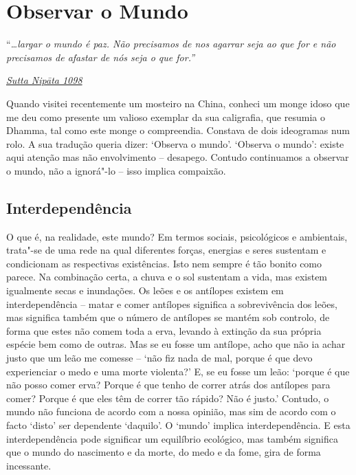 \chapter{Observar o Mundo}

``\emph{\ldots{}largar o mundo é paz. Não precisamos de nos agarrar seja ao que for e não precisamos de afastar de nós seja o que for.''}

\href{https://suttacentral.net/snp5.12/en/sujato}{\emph{Sutta Nipāta 1098}}

Quando visitei recentemente um mosteiro na China, conheci um monge idoso que me deu como presente um valioso exemplar da sua caligrafia, que resumia o Dhamma, tal como este monge o compreendia. Constava de dois ideogramas num rolo. A sua tradução queria dizer: `Observa o mundo'. `Observa o mundo': existe aqui atenção mas não envolvimento -- desapego. Contudo continuamos a observar o mundo, não a ignorá"-lo -- isso implica compaixão.

\section{Interdependência}

O que é, na realidade, este mundo? Em termos sociais, psicológicos e ambientais, trata"-se de uma rede na qual diferentes forças, energias e seres sustentam e condicionam as respectivas existências. Isto nem sempre é tão bonito como parece. Na combinação certa, a chuva e o sol sustentam a vida, mas existem igualmente secas e inundações. Os leões e os antílopes existem em interdependência -- matar e comer antílopes significa a sobrevivência dos leões, mas significa também que o número de antílopes se mantém sob controlo, de forma que estes não comem toda a erva, levando à extinção da sua própria espécie bem como de outras. Mas se eu fosse um antílope, acho que não ia achar justo que um leão me comesse -- `não fiz nada de mal, porque é que devo experienciar o medo e uma morte violenta?' E, se eu fosse um leão: `porque é que não posso comer erva? Porque é que tenho de correr atrás dos antílopes para comer? Porque é que eles têm de correr tão rápido? Não é justo.' Contudo, o mundo não funciona de acordo com a nossa opinião, mas sim de acordo com o facto `disto' ser dependente `daquilo'. O `mundo' implica interdependência. E esta interdependência pode significar um equilíbrio ecológico, mas também significa que o mundo do nascimento e da morte, do medo e da fome, gira de forma incessante.

